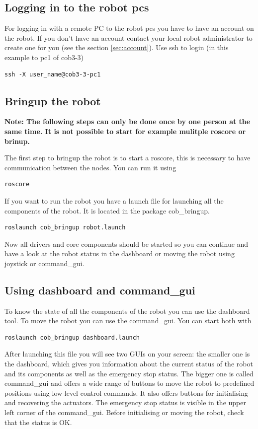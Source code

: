 \subsection{Logging in to the robot pcs}
For logging in with a remote PC to the robot pcs you have to have an account on the robot. If you don't have an account contact your local robot administrator to create one for you (see the section \ref{sec:account}). Use ssh to login (in this example to pc1 of cob3-3)

\begin{lstlisting}
ssh -X user_name@cob3-3-pc1
\end{lstlisting}

\subsection{Bringup the robot}
\textbf{Note: The following steps can only be done once by one person at the same time. It is not possible to start for example mulitple roscore or brinup.}

The first step to bringup the robot is to start a roscore, this is necessary to have communication between the nodes. You can run it using
\begin{lstlisting}
roscore
\end{lstlisting}

If you want to run the robot you have a launch file for launching all the components of the robot. It is located in the package cob\_bringup.
\begin{lstlisting}
roslaunch cob_bringup robot.launch
\end{lstlisting}

Now all drivers and core components should be started so you can continue and have a look at the robot status in the dashboard or moving the robot using joystick or command\_gui.

\subsection{Using dashboard and command\_gui}
To know the state of all the components of the robot you can use the dashboard tool. To move the robot you can use the command\_gui. You can start both with
\begin{lstlisting}
roslaunch cob_bringup dashboard.launch
\end{lstlisting}

After launching this file you will see two GUIs on your screen: the smaller one is the dashboard, which gives you information about the current status of the robot and its components as well as the emergency stop status. The bigger one is called command\_gui and offers a wide range of buttons to move the robot to predefined positions using low level control commands. It also offers buttons for initialising and recovering the actuators. The emergency stop status is visible in the upper left corner of the command\_gui. Before initialising or moving the robot, check that the status is OK.

